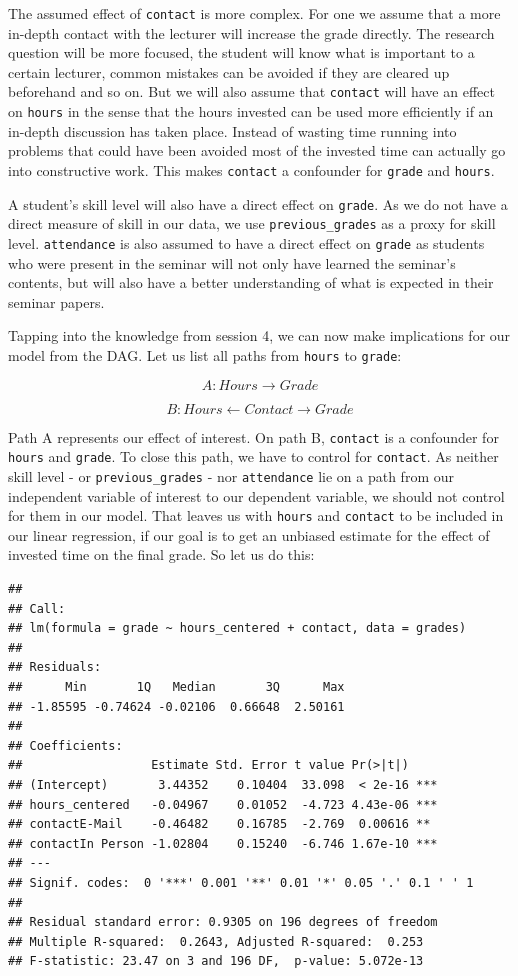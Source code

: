 \documentclass[
]{book}
\begin{document}
The assumed effect of \texttt{contact} is more complex. For one we assume that a more
in-depth contact with the lecturer will increase the grade directly. The
research question will be more focused, the student will know what is important
to a certain lecturer, common mistakes can be avoided if they are cleared up
beforehand and so on. But we will also assume that \texttt{contact} will have an effect
on \texttt{hours} in the sense that the hours invested can be used more efficiently if
an in-depth discussion has taken place. Instead of wasting time running into
problems that could have been avoided most of the invested time can actually go
into constructive work. This makes \texttt{contact} a confounder for \texttt{grade} and
\texttt{hours}.

A student's skill level will also have a direct effect on \texttt{grade}. As we do not
have a direct measure of skill in our data, we use \texttt{previous\_grades} as a proxy
for skill level. \texttt{attendance} is also assumed to have a direct effect on \texttt{grade}
as students who were present in the seminar will not only have learned the seminar's
contents, but will also have a better understanding of what is expected in their
seminar papers.

Tapping into the knowledge from session 4, we can now make implications for our
model from the DAG. Let us list all paths from \texttt{hours} to \texttt{grade}:

\[A: Hours \rightarrow Grade\]

\[B: Hours \leftarrow Contact \rightarrow Grade\]

Path A represents our effect of interest. On path B, \texttt{contact} is a confounder
for \texttt{hours} and \texttt{grade}. To close this path, we have to control for \texttt{contact}.
As neither skill level - or \texttt{previous\_grades} - nor \texttt{attendance} lie on a path
from our independent variable of interest to our dependent variable, we should
not control for them in our model.
That leaves us with \texttt{hours} and \texttt{contact} to be included in our linear
regression, if our goal is to get an unbiased estimate for the effect of
invested time on the final grade. So let us do this:

\begin{verbatim}
## 
## Call:
## lm(formula = grade ~ hours_centered + contact, data = grades)
## 
## Residuals:
##      Min       1Q   Median       3Q      Max 
## -1.85595 -0.74624 -0.02106  0.66648  2.50161 
## 
## Coefficients:
##                  Estimate Std. Error t value Pr(>|t|)    
## (Intercept)       3.44352    0.10404  33.098  < 2e-16 ***
## hours_centered   -0.04967    0.01052  -4.723 4.43e-06 ***
## contactE-Mail    -0.46482    0.16785  -2.769  0.00616 ** 
## contactIn Person -1.02804    0.15240  -6.746 1.67e-10 ***
## ---
## Signif. codes:  0 '***' 0.001 '**' 0.01 '*' 0.05 '.' 0.1 ' ' 1
## 
## Residual standard error: 0.9305 on 196 degrees of freedom
## Multiple R-squared:  0.2643, Adjusted R-squared:  0.253 
## F-statistic: 23.47 on 3 and 196 DF,  p-value: 5.072e-13
\end{verbatim}
\end{document}
